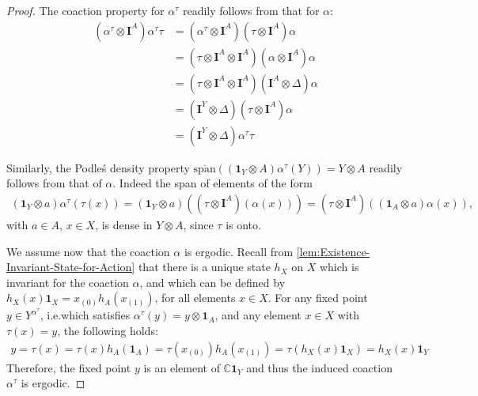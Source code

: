 \documentclass{amsart}
\theoremstyle{plain}
\theoremstyle{definition}
\theoremstyle{remark}
\begin{document}
	\begin{proof}
		The coaction property for $\alpha^\tau$ readily follows from that for $\alpha$:
		\begin{align}
			(\alpha^\tau \otimes \mathbf{I}^A) \alpha^\tau \tau
			&= (\alpha^\tau \otimes \mathbf{I}^A) (\tau \otimes \mathbf{I}^A) \alpha \\
			&= (\tau \otimes \mathbf{I}^A \otimes \mathbf{I}^A) (\alpha \otimes \mathbf{I}^A) \alpha \\
			&= (\tau \otimes \mathbf{I}^A \otimes \mathbf{I}^A) (\mathbf{I}^A \otimes \Delta) \alpha  \\
			&= (\mathbf{I}^Y \otimes \Delta) (\tau \otimes \mathbf{I}^A) \alpha \\
			&= (\mathbf{I}^Y \otimes \Delta) \alpha^\tau \tau
		\end{align}
		
		Similarly, the Podleś density property $\overline{\mathrm{span}}((\mathbf{1}_Y \otimes A) \alpha^\tau(Y)) = Y \otimes A$ readily follows from that of $\alpha$.
		Indeed the span of elements of the form
		\begin{align}
			(\mathbf{1}_Y \otimes a) \alpha^\tau(\tau(x))
			= (\mathbf{1}_Y \otimes a) \left((\tau \otimes \mathbf{I}^A) (\alpha(x))\right) 
			= (\tau \otimes \mathbf{I}^A) \left((\mathbf{1}_A \otimes a) \alpha(x)\right),
		\end{align}	
		with $a \in A$, $x \in X$, is dense in $Y \otimes A$, since $\tau$ is onto.
		
		We assume now that the coaction $\alpha$ is ergodic.
		Recall from \autoref{lem:Existence-Invariant-State-for-Action} that there is a unique state $h_X$ on $X$ which is invariant for the coaction $\alpha$, and which can be defined by $h_X(x)\mathbf{1}_X = x_{(0)} h_A(x_{(1)})$, for all elements $x \in X$.
		For any fixed point $y \in Y^{\alpha^\tau}$, i.e.\@ which satisfies $\alpha^\tau(y) = y \otimes \mathbf{1}_A$, and any element $x \in X$ with $\tau(x) = y$, the following holds:
		\begin{align}\label{eqn:Fixed-points-of-induced-action-are-scalars}
			y
			= \tau(x)
			= \tau(x) h_A(\mathbf{1}_A)
			= \tau(x_{(0)}) h_A(x_{(1)})
			= \tau(h_X(x)\mathbf{1}_X)
			= h_X(x)\mathbf{1}_Y
		\end{align}
		Therefore, the fixed point $y$ is an element of $\mathbb{C}\mathbf{1}_Y$ and thus the induced coaction $\alpha^\tau$ is ergodic.
	\end{proof}
	
	
	
\end{document}
